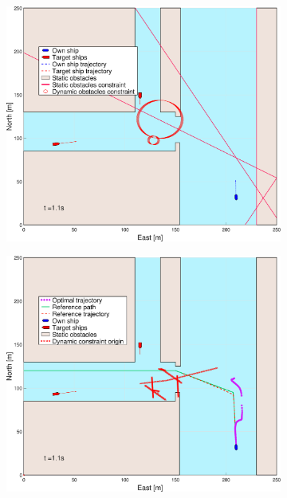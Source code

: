 \clearpage
\begin{figure}[!ht] %
    \begin{subfigure}[b]{0.494\textwidth}
        \centering
        \includegraphics[width=\textwidth]{Images/Figures/Havn1/_Simple_0fig1_time=1}
        \subcaption{}
    \end{subfigure}
    \hfill
    \begin{subfigure}[b]{0.494\textwidth}
        \centering
        \includegraphics[width=\textwidth]{Images/Figures/Havn1/_Simple_0fig999_time=1}

\end{subfigure}
\end{figure}
